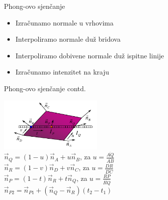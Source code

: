 \documentclass[9pt]{beamer}
\begin{document}
\begin{frame}{Phong-ovo sjenčanje}       
	\begin{itemize}%
		\item Izračunamo normale u vrhovima
		\item Interpoliramo normale duž bridova
		\item Interpoliramo dobivene normale duž ispitne linije
		\item Izračunamo intenzitet na kraju
	\end{itemize}
\end{frame}


\begin{frame}{Phong-ovo sjenčanje contd. }
	\begin{center}
		\includegraphics[width=5cm]{slike/10_phong1.png}\\
		$\vec{n}_{Q} =(1-u)\vec{n}_{A}+u\vec{n}_{B}$, za $u=\frac{\overline{AQ}}{\overline{AB}}$\\
		$\vec{n}_{R} =(1-v)\vec{n}_{D}+v\vec{n}_{C}$, za $u=\frac{\overline{DR}}{\overline{DC}}$\\
		$\vec{n}_{P} =(1-t)\vec{n}_{R}+t\vec{n}_{Q}$, za $u=\frac{\overline{RP}}{\overline{RQ}}$\\
		$\vec{n}_{P2} =\vec{n}_{P1} + (\vec{n}_{Q}-\vec{n}_{R})(t_{2}-t_{1})$
	\end{center}
\end{frame}

\end{document}
